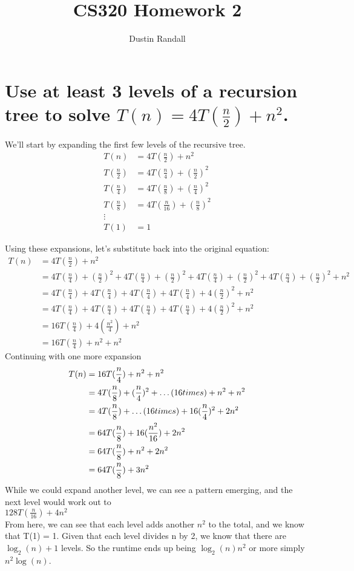 \documentclass{article}
\begin{document}
\title{CS320 Homework 2}
\author{Dustin Randall}
\maketitle

\section{Use at least 3 levels of a recursion tree to solve \(T(n) = 4T(\frac{n}{2}) + n^2\).}
We'll start by expanding the first few levels of the recursive tree.
\begin{align*}
    T(n) &= 4T(\frac{n}{2}) + n^2 \\
    T(\frac{n}{2}) &= 4T(\frac{n}{4}) + (\frac{n}{2})^2 \\
    T(\frac{n}{4}) &= 4T(\frac{n}{8}) + (\frac{n}{4})^2 \\
    T(\frac{n}{8}) &= 4T(\frac{n}{16}) + (\frac{n}{8})^2 \\
    \vdots \\
    T(1) &= 1
\end{align*}

Using these expansions, let's substitute back into the original equation:
\begin{align*}
    T(n) &= 4T(\frac{n}{2}) + n^2 \\
         &= 4T(\frac{n}{4}) + (\frac{n}{2})^2 + 4T(\frac{n}{4}) + (\frac{n}{2})^2 + 4T(\frac{n}{4}) + (\frac{n}{2})^2 + 4T(\frac{n}{4}) + (\frac{n}{2})^2 + n^2 \\
         &= 4T(\frac{n}{4}) + 4T(\frac{n}{4}) + 4T(\frac{n}{4}) + 4T(\frac{n}{4}) + 4(\frac{n}{2})^2 + n^2 \\
         &= 4T(\frac{n}{4}) + 4T(\frac{n}{4}) + 4T(\frac{n}{4}) + 4T(\frac{n}{4}) + 4(\frac{n}{2})^2 + n^2 \\
         &= 16T(\frac{n}{4}) + 4(\frac{n^2}{4}) + n^2 \\
         &= 16T(\frac{n}{4}) + n^2 + n^2
\end{align*}
Continuing with one more expansion
\begin{align*}
    T(n) &= 16T(\frac{n}{4}) + n^2 + n^2 \\
         &= 4T(\frac{n}{8}) + (\frac{n}{4})^2 + \dots \text(16 times) + n^2 + n^2 \\
         &= 4T(\frac{n}{8}) + \dots \text(16 times) + 16(\frac{n}{4})^2 + 2n^2 \\
         &= 64T(\frac{n}{8}) + 16(\frac{n^2}{16}) + 2n^2 \\
         &= 64T(\frac{n}{8}) + n^2 + 2n^2 \\
         &= 64T(\frac{n}{8}) + 3n^2
\end{align*}
While we could expand another level, we can see a pattern emerging, and the next level would work out to \\
\(128T(\frac{n}{16}) + 4n^2\) \\
From here, we can see that each level adds another \(n^2\) to the total, and we know that T(1) = 1.
Given that each level divides n by 2, we know that there are \(\log_2(n) + 1\) levels.
So the runtime ends up being \(\log_2(n)n^2\) or more simply \(n^2 \log(n)\).
\end{document}
